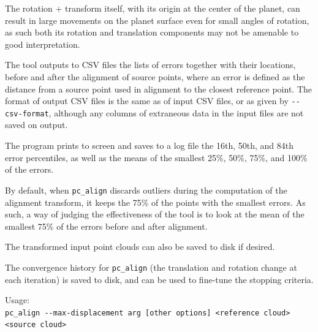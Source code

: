 The rotation + transform itself, with its origin at the center of the planet,
can result in large movements on the planet surface even for small angles
of rotation, as such both its rotation and translation components may not
be amenable to good interpretation.

The tool outputs to CSV files the lists of errors together with their
locations, before and after the alignment of source points, where an
error is defined as the distance from a source point used in alignment
to the closest reference point. The format of output CSV files is the
same as of input CSV files, or as given by \texttt{-\/-csv-format},
although any columns of extraneous data in the input files are not
saved on output.

The program prints to screen and saves to a log file the 16th, 50th, and
84th error percentiles, as well as the means of the smallest 25\%, 50\%,
75\%, and 100\% of the errors.

By default, when \texttt{pc\_align} discards outliers during the
computation of the alignment transform, it keeps the 75\% of the points
with the smallest errors. As such, a way of judging the effectiveness of
the tool is to look at the mean of the smallest 75\% of the errors
before and after alignment.

The transformed input point clouds can also be saved to disk if desired.

The convergence history for \texttt{pc\_align} (the translation and
rotation change at each iteration) is saved to disk, and can be used to
fine-tune the stopping criteria.

\medskip

Usage:\\
\hspace*{2em}\texttt{pc\_align -\/-max-displacement arg [other options] <reference cloud> <source cloud>}

\medskip

